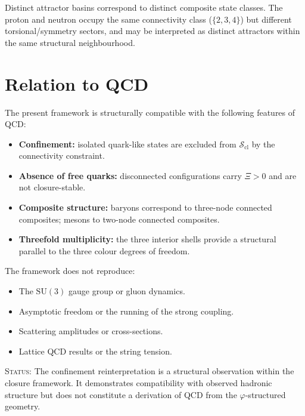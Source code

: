 \documentclass[12pt]{article}
\newcommand{\Scl}{\mathcal{S}_{\mathrm{cl}}}
\newcommand{\phig}{\varphi}
\begin{document}
Distinct attractor basins correspond to distinct composite state classes. The proton and neutron occupy the same connectivity class ($\{2,3,4\}$) but different torsional/symmetry sectors, and may be interpreted as distinct attractors within the same structural neighbourhood.

\section{Relation to QCD}\label{sec:qcd}

The present framework is structurally compatible with the following features of QCD:

\begin{itemize}
    \item \textbf{Confinement:} isolated quark-like states are excluded from $\Scl$ by the connectivity constraint.
    \item \textbf{Absence of free quarks:} disconnected configurations carry $\Xi > 0$ and are not closure-stable.
    \item \textbf{Composite structure:} baryons correspond to three-node connected composites; mesons to two-node connected composites.
    \item \textbf{Threefold multiplicity:} the three interior shells provide a structural parallel to the three colour degrees of freedom.
\end{itemize}

The framework does not reproduce:

\begin{itemize}
    \item The $\mathrm{SU}(3)$ gauge group or gluon dynamics.
    \item Asymptotic freedom or the running of the strong coupling.
    \item Scattering amplitudes or cross-sections.
    \item Lattice QCD results or the string tension.
\end{itemize}

\textsc{Status:} The confinement reinterpretation is a structural observation within the closure framework. It demonstrates compatibility with observed hadronic structure but does not constitute a derivation of QCD from the $\phig$-structured geometry.

\end{document}
